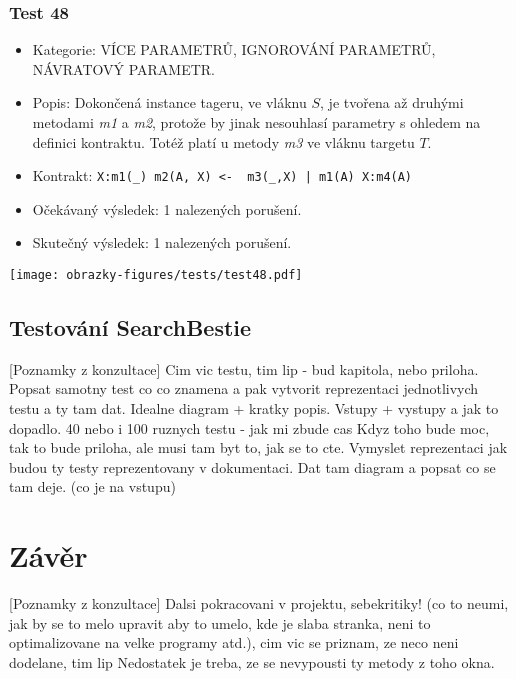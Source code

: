 \subsection*{Test 48}
\begin{itemize}
\item Kategorie: VÍCE PARAMETRŮ, IGNOROVÁNÍ PARAMETRŮ, NÁVRATOVÝ PARAMETR.
\item Popis: Dokončená instance tageru, ve vláknu $S$, je tvořena až druhými metodami \textit{m1} a \textit{m2}, protože by jinak nesouhlasí parametry s ohledem na definici kontraktu. Totéž platí u metody \textit{m3} ve vláknu targetu $T$. 
\item Kontrakt: \texttt{X:m1(_) m2(A, X) <- { m3(_,X) | m1(A) X:m4(A) }}

\item Očekávaný výsledek: 1 nalezených porušení.
\item Skutečný výsledek: 1 nalezených porušení.
\end{itemize}
\begin{center}
    \centering
    \texttt{[image: obrazky-figures/tests/test48.pdf]}
    \label{test48}
\end{center}


\section{Testování SearchBestie}

[Poznamky z konzultace] Cim vic testu, tim lip - bud kapitola, nebo priloha. Popsat samotny test co co znamena a pak vytvorit reprezentaci jednotlivych testu a ty tam dat. Idealne diagram + kratky popis. Vstupy + vystupy a jak to dopadlo.
40 nebo i 100 ruznych testu - jak mi zbude cas
Kdyz toho bude moc, tak to bude priloha, ale musi tam byt to, jak se to cte. Vymyslet reprezentaci jak budou ty testy reprezentovany v dokumentaci. Dat tam diagram a popsat co se tam deje. (co je na vstupu)

\chapter{Závěr}

[Poznamky z konzultace] Dalsi pokracovani v projektu, sebekritiky! (co to neumi, jak by se to melo upravit aby to umelo, kde je slaba stranka, neni to optimalizovane na velke programy atd.), cim vic se priznam, ze neco neni dodelane, tim lip
Nedostatek je treba, ze se nevypousti ty metody z toho okna.


